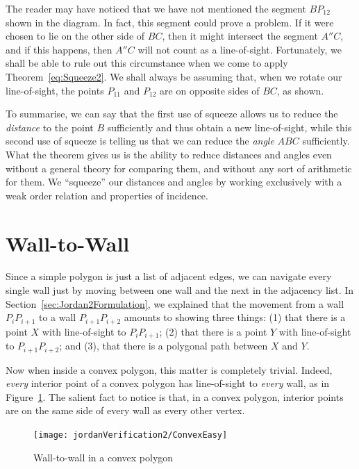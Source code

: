 The reader may have noticed that we have not mentioned the segment $BP_{12}$ shown in the diagram. In fact, this segment could prove a problem. If it were chosen to lie on the other side of $BC$, then it might intersect the segment $A''C$, and if this happens, then $A''C$ will not count as a line-of-sight. Fortunately, we shall be able to rule out this circumstance when we come to apply Theorem~\ref{eq:Squeeze2}. We shall always be assuming that, when we rotate our line-of-sight, the points $P_{11}$ and $P_{12}$ are on opposite sides of $BC$, as shown.

To summarise, we can say that the first use of squeeze allows us to reduce the \emph{distance} to the point $B$ sufficiently and thus obtain a new line-of-sight, while this second use of squeeze is telling us that we can reduce the \emph{angle} $ABC$ sufficiently. What the theorem gives us is the ability to reduce distances and angles even without a general theory for comparing them, and without any sort of arithmetic for them. We ``squeeze'' our distances and angles by working exclusively with a weak order relation and properties of incidence.

\section{Wall-to-Wall}\label{sec:NavigationVerification}
Since a simple polygon is just a list of adjacent edges, we can navigate every single wall just by moving between one wall and the next in the adjacency list. In Section~\ref{sec:Jordan2Formulation}, we explained that the movement from a wall $P_{i}P_{i+1}$ to a wall $P_{i+1}P_{i+2}$ amounts to showing three things: (1) that there is a point $X$ with line-of-sight to $P_{i}P_{i+1}$; (2) that there is a point $Y$ with line-of-sight to $P_{i+1}P_{i+2}$; and (3), that there is a polygonal path between $X$ and $Y$.

Now when inside a convex polygon, this matter is completely trivial. Indeed, \emph{every} interior point of a convex polygon has line-of-sight to \emph{every} wall, as in Figure~\ref{fig:ConvexEasy}. The salient fact to notice is that, in a convex polygon, interior points are on the same side of every wall as every other vertex. 

\begin{figure}
\centering\texttt{[image: jordanVerification2/ConvexEasy]}
\caption{Wall-to-wall in a convex polygon}
\label{fig:ConvexEasy}
\end{figure}

